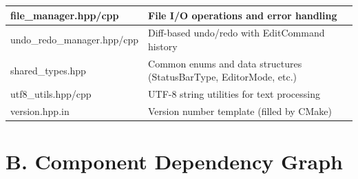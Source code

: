 \documentclass[12pt,a4paper,oneside,openany]{report}
\begin{document}
\begin{table}[H]
\begin{tabular}{|l|p{8cm}|}
		\hline
		file\_manager.hpp/cpp       & File I/O operations and error handling                                              \\
		\hline
		undo\_redo\_manager.hpp/cpp & Diff-based undo/redo with EditCommand history                                       \\
		\hline
		shared\_types.hpp           & Common enums and data structures (StatusBarType, EditorMode, etc.)                  \\
		\hline
		utf8\_utils.hpp/cpp         & UTF-8 string utilities for text processing                                          \\
		\hline
		version.hpp.in              & Version number template (filled by CMake)                                           \\
		\hline
	\end{tabular}
\end{table}

\section*{B. Component Dependency Graph}
\end{document}
